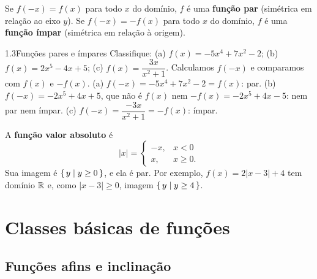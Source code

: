 \begin{definicao}
Se $f(-x)=f(x)$ para todo $x$ do domínio, $f$ é uma \textbf{função par} (simétrica em
relação ao eixo $y$). Se $f(-x)=-f(x)$ para todo $x$ do domínio, $f$ é uma
\textbf{função ímpar} (simétrica em relação à origem).
\end{definicao}


\begin{exemplo}{1.3}{Funções pares e ímpares}
Classifique: (a) $f(x)=-5x^4+7x^2-2$; (b) $f(x)=2x^5-4x+5$; (c) $f(x)=\dfrac{3x}{x^2+1}$.
\solucao
Calculamos $f(-x)$ e comparamos com $f(x)$ e $-f(x)$.
(a) $f(-x)=-5x^4+7x^2-2=f(x)$: par.
(b) $f(-x)=-2x^5+4x+5$, que não é $f(x)$ nem $-f(x)=-2x^5+4x-5$: nem par nem ímpar.
(c) $f(-x)=\dfrac{-3x}{x^2+1}=-f(x)$: ímpar.
\end{exemplo}

A \textbf{função valor absoluto} é
\[
|x|=\begin{cases}-x, & x<0\\ x, & x\ge0.\end{cases}
\]
Sua imagem é $\{\,y \mid y\ge0\,\}$, e ela é par. Por exemplo, $f(x)=2|x-3|+4$ tem domínio $\mathbb{R}$
e, como $|x-3|\ge0$, imagem $\{\,y \mid y\ge4\,\}$.

\section{Classes básicas de funções}

\subsection{Funções afins e inclinação}

